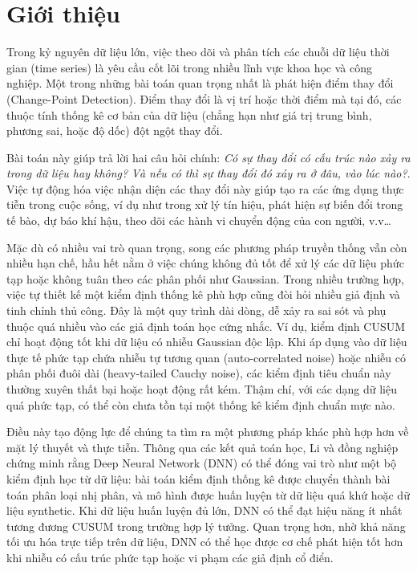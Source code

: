 \section{Giới thiệu}
Trong kỷ nguyên dữ liệu lớn, việc theo dõi và phân tích các chuỗi dữ liệu thời gian (time series) là
yêu cầu cốt lõi trong nhiều lĩnh vực khoa học và công nghiệp. 
Một trong những bài toán quan trọng nhất là phát hiện điểm thay đổi (Change-Point Detection).
Điểm thay đổi là vị trí hoặc thời điểm mà tại đó, các thuộc tính thống kê cơ bản của dữ liệu 
(chẳng hạn như giá trị trung bình, phương sai, hoặc độ dốc) đột ngột thay đổi.

Bài toán này giúp trả lời hai câu hỏi chính: \textit{Có sự thay đổi có cấu trúc nào xảy ra trong dữ liệu hay không?}
\textit{Và nếu có thì sự thay đổi đó xảy ra ở đâu, vào lúc nào?}. Việc tự động hóa việc nhận diện các thay đổi này 
giúp tạo ra các ứng dụng thực tiễn trong cuộc sống, ví dụ như trong xử lý tín hiệu, phát hiện sự biến đổi trong tế bào, dự báo khí hậu, 
theo dõi các hành vi chuyển động của con người, v.v\dots

Mặc dù có nhiều vai trò quan trọng, song các phương pháp truyền thống vẫn còn nhiều hạn chế, hầu hết nằm ở việc chúng 
không đủ tốt để xử lý các dữ liệu phức tạp hoặc không tuân theo các phân phối như Gaussian. Trong nhiều trường hợp,
việc tự thiết kế một kiểm định thống kê phù hợp cũng đòi hỏi nhiều giả định và tinh chỉnh thủ công.
Đây là một quy trình dài dòng, dễ xảy ra sai sót và phụ thuộc quá nhiều vào các giả định toán học cứng nhắc. 
Ví dụ, kiểm định CUSUM chỉ hoạt động tốt khi dữ liệu có nhiễu Gaussian độc lập. 
Khi áp dụng vào dữ liệu thực tế phức tạp chứa nhiễu tự tương quan (auto-correlated noise) hoặc nhiễu có phân phối đuôi dài
(heavy-tailed Cauchy noise), các kiểm định tiêu chuẩn này thường xuyên thất bại hoặc hoạt động rất kém. 
Thậm chí, với các dạng dữ liệu quá phức tạp, có thể còn chưa tồn tại một thống kê kiểm định chuẩn mực nào.

Điều này tạo động lực để chúng ta tìm ra một phương pháp khác phù hợp hơn về mặt lý thuyết và thực tiễn.
Thông qua các kết quả toán học, Li và đồng nghiệp chứng minh rằng Deep Neural Network (DNN)
có thể đóng vai trò như một bộ kiểm định học từ dữ liệu: bài toán kiểm định thống kê được chuyển thành bài toán phân loại nhị phân,
và mô hình được huấn luyện từ dữ liệu quá khứ hoặc dữ liệu synthetic. Khi dữ liệu huấn luyện đủ lớn,
DNN có thể đạt hiệu năng ít nhất tương đương CUSUM trong trường hợp lý tưởng. Quan trọng hơn, nhờ khả năng tối ưu hóa trực tiếp trên dữ liệu,
DNN có thể học được cơ chế phát hiện tốt hơn khi nhiễu có cấu trúc phức tạp hoặc vi phạm các giả định cổ điển.

